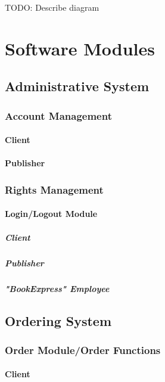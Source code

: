 \documentclass[11pt,a4paper,oneside,svgnames]{report}
\begin{document}
TODO: Describe diagram

\chapter{Software Modules}

\section{Administrative System}
\subsection{Account Management}

\subsubsection{Client}
\subsubsection{Publisher}

\subsection{Rights Management}

\subsubsection{Login/Logout Module}
\paragraph{Client}
\paragraph{Publisher}
\paragraph{"BookExpress" Employee}


\section{Ordering System}

\subsection{Order Module/Order Functions}
\subsubsection{Client}
\end{document}
